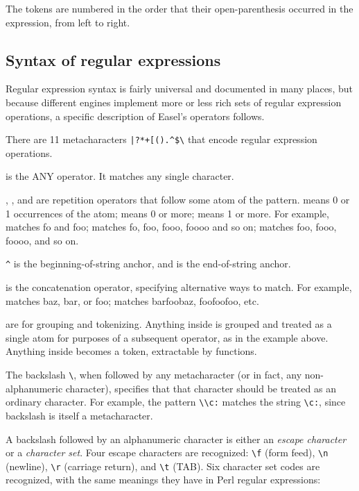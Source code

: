 The tokens are numbered in the order that their open-parenthesis
occurred in the expression, from left to right.

\subsection{Syntax of regular expressions}

Regular expression syntax is fairly universal and documented in many
places, but because different engines implement more or less rich sets
of regular expression operations, a specific description of Easel's
operators follows.

There are 11 metacharacters \verb'|?*+[().^$\' that encode regular
expression operations.

 is the ANY operator. It matches any single character.

, \ccode{*}, and \ccode{+} are repetition operators that
follow some atom of the pattern.  means 0 or 1 occurrences of
the atom; \ccode{*} means 0 or more; \ccode{+} means 1 or more.  For
example,  matches fo and foo;  matches fo,
foo, fooo, foooo and so on;  matches foo, fooo, foooo, and
so on.

\verb'^' is the beginning-of-string anchor, and \ccode{\$} is the
end-of-string anchor. 

\ccode{|} is the concatenation operator, specifying alternative ways
to match. For example,  matches baz, bar, or foo;
 matches barfoobaz, foofoofoo, etc.

\ccode{()} are for grouping and tokenizing. Anything inside \ccode{()}
is grouped and treated as a single atom for purposes of a subsequent
 operator, as in the  example above.
Anything inside \ccode{()} becomes a token, extractable by
 functions.

The backslash \verb+\+, when followed by any metacharacter (or in
fact, any non-alphanumeric character), specifies that that character
should be treated as an ordinary character.  For example, the pattern
\verb+\\c:+ matches the string \verb+\c:+, since backslash is itself a
metacharacter.

A backslash followed by an alphanumeric character is either an
\emph{escape character} or a \emph{character set}. Four escape
characters are recognized: \verb+\f+ (form feed), \verb+\n+ (newline),
\verb+\r+ (carriage return), and \verb+\t+ (TAB). Six character set
codes are recognized, with the same meanings they have in Perl regular
expressions:

